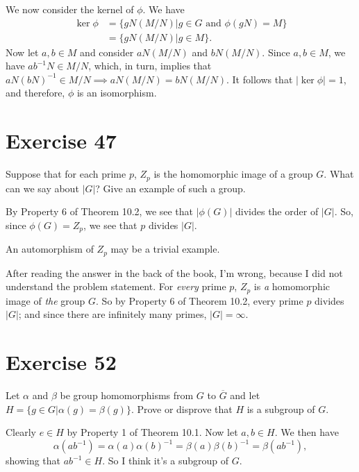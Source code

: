 \documentclass[12pt]{article}
\begin{document}
We now consider the kernel of $\phi$.  We have
\begin{align*}
\ker\phi &=\{gN(M/N)|\mbox{$g\in G$ and $\phi(gN)=M$}\} \\
 &= \{gN(M/N)|g\in M\}.
\end{align*}
Now let $a,b\in M$ and consider $aN(M/N)$ and $bN(M/N)$.
Since $a,b\in M$, we have $ab^{-1}N\in M/N$,
which, in turn, implies that $aN(bN)^{-1}\in M/N\implies aN(M/N)=bN(M/N)$.
It follows that $|\ker\phi|=1$, and therefore, $\phi$ is an isomorphism.

\section*{Exercise 47}

Suppose that for each prime $p$, $Z_p$ is the homomorphic image of a group $G$.
What can we say about $|G|$?  Give an example of such a group.

By Property 6 of Theorem 10.2, we see that $|\phi(G)|$ divides the order of $|G|$.
So, since $\phi(G)=Z_p$, we see that $p$ divides $|G|$.

An automorphism of $Z_p$ may be a trivial example.

After reading the answer in the back of the book, I'm wrong, because I did not understand
the problem statement.  For {\it every} prime $p$, $Z_p$ is {\it a} homomorphic image of {\it the}
group $G$.  So by Property 6 of Theorem 10.2, every prime $p$ divides $|G|$; and since
there are infinitely many primes, $|G|=\infty$.

\section*{Exercise 52}

Let $\alpha$ and $\beta$ be group homomorphisms from $G$ to $\overline{G}$ and let
$H=\{g\in G|\alpha(g)=\beta(g)\}$.  Prove or disprove that $H$ is a subgroup of $G$.

Clearly $e\in H$ by Property 1 of Theorem 10.1.
Now let $a,b\in H$.  We then have
\begin{equation*}
\alpha(ab^{-1})=\alpha(a)\alpha(b)^{-1}=\beta(a)\beta(b)^{-1}=\beta(ab^{-1}),
\end{equation*}
showing that $ab^{-1}\in H$.  So I think it's a subgroup of $G$.
\end{document}
